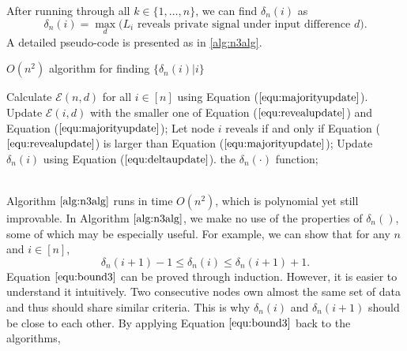 \documentclass[a4paper,UKenglish]{lipics}
\theoremstyle{definition}
\newcommand{\hide}[1]{} %
\begin{document}
After running through all $k\in \{1, \dots, n\}$, we can find $\delta_n(i)$ as
\begin{equation}
\label{equ:deltaupdate}
	\delta_n(i)
	 = 
	 \max_{d} \Big( \text{$L_i$ reveals private signal under input difference $d$} \Big).
\end{equation}
A detailed pseudo-code is presented as in \ref{alg:n3alg}.
\begin{algorithm}[htb]
\caption{$O(n^2)$ algorithm for finding $\{\delta_n(i)|i\}$} \label{alg:n3alg}
\begin{algorithmic}[1]
\hide{
\REQUIRE ~~\\
	The set of positive samples for current batch, $P_n$;\\
	The set of unlabeled samples for current batch, $U_n$;\\
	Ensemble of classifiers on former batches, $E_{n-1}$;\\
\ENSURE ~~\\              
	Ensemble of classifiers on the current batch, $E_n$;
	}
\STATE Calculate $\mathcal{E}(n,d)$ for all $i\in [n]$ using Equation ($\ref{equ:majorityupdate}$). 
	\STATE Update $\mathcal{E}(i,d)$ with the smaller one of Equation ($\ref{equ:revealupdate}$) and Equation ($\ref{equ:majorityupdate}$);
	\STATE Let node $i$ reveals if and only if Equation ($\ref{equ:revealupdate}$) is larger than Equation ($\ref{equ:majorityupdate}$);
\ENDFOR
{}
	\STATE Update $\delta_n(i)$ using Equation ($\ref{equ:deltaupdate}$).
\ENDFOR
\RETURN the $\delta_n(\cdot)$ function;

\end{algorithmic}
\end{algorithm}
\\
Algorithm $\ref{alg:n3alg}$ runs in time $O(n^2)$, which is polynomial yet still improvable. 
In Algorithm $\ref{alg:n3alg}$, we make no use of the properties of $\delta_n()$,
	some of which may be especially useful.
For example, we can show that for any $n$ and $i\in[n]$,
\begin{equation}
\label{equ:bound3}
\delta_n(i+1)-1\le \delta_n(i)\le \delta_n(i+1)+1.
\end{equation}
Equation $\ref{equ:bound3}$ can be proved through induction.
However, it is easier to understand it intuitively.
Two consecutive nodes own almost the same set of data and thus should share similar criteria.
This is why $\delta_n(i)$ and $\delta_n(i+1)$ should be close to each other.  
By applying Equation $\eqref{equ:bound3}$ back to the algorithms, 
\end{document}
